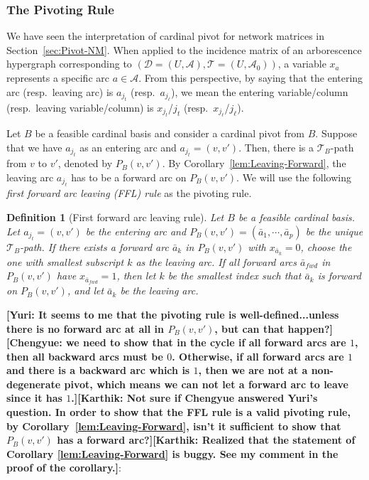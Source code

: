 \documentclass[11pt]{article}
\newcommand{\knote}[1]{{\bf{\color{blue}[\tiny Karthik: #1]}}}
\newcommand{\cnote}[1]{{\bf{\color{red}[\tiny Chengyue: #1]}}}
\newcommand{\ynote}[1]{{\bf{\color{orange}[\tiny Yuri: #1]}}}
\newtheorem{definition}[theorem]{Definition}
\begin{document}
\subsubsection{The Pivoting Rule}\label{sec:FFL}

We have seen the interpretation of cardinal pivot for network matrices in Section~\ref{sec:Pivot-NM}. When applied to the incidence matrix of an arborescence hypergraph corresponding to $(\mathcal{D}=(U,\mathcal{A}),\mathcal{T}=(U,\mathcal{A}_0))$, a variable $x_a$ represents a specific arc $a\in \mathcal{A}$. From this perspective, by saying that the entering arc (resp.~leaving arc) is $a_{j_t}$ (resp.~$a_{j_\ell}$), we mean the entering variable/column (resp.~leaving variable/column) is $x_{j_t}$/$j_t$ (resp.~$x_{j_\ell}$/$j_\ell$). 




Let $B$ be a feasible cardinal basis and consider a cardinal pivot from $B$. Suppose that we have $a_{j_t}$ as an entering arc and $a_{j_t}=(v,v')$. Then, there is a $\mathcal{T}_B$-path from $v$ to $v'$, denoted by $P_B(v,v')$. By Corollary~\ref{lem:Leaving-Forward}, the leaving arc $a_{j_\ell}$ has to be a forward arc on $P_B(v,v')$. We will use the following \emph{first forward arc leaving (FFL) rule} as the pivoting rule. 

\begin{definition}[First forward arc leaving rule]\label{def:First-Forward-Leaving}
Let $B$ be a feasible cardinal basis. Let $a_{j_t}=(v,v')$ be the entering arc and $P_B(v,v')=(\bar{a}_1,\cdots,\bar{a}_p)$ be the unique $\mathcal{T}_B$-path. If there exists a forward arc $\bar{a}_k$ in $P_B(v,v')$ with $x_{\bar{a}_k}=0$, choose the one with smallest subscript $k$ as the leaving arc. If all forward arcs $\bar{a}_{fwd}$ in $P_B(v,v')$ have $x_{\bar{a}_{fwd}}=1$, then let $k$ be the smallest index such that $\bar{a}_k$ is forward on $P_B(v,v')$, and let $\bar{a}_k$ be the leaving arc. \end{definition}

\iffalse
\ynote{It seems to me that the pivoting rule is well-defined...unless there is no forward arc at all in $P_B(v,v')$, but can that happen?}\cnote{we need to show that in the cycle if all forward arcs are $1$, then all backward arcs must be $0$. Otherwise, if all forward arcs are $1$ and there is a backward arc which is $1$, then we are not at a non-degenerate pivot, which means we can not let a forward arc to leave since it has $1$.}\knote{Not sure if Chengyue answered Yuri's question. In order to show that the FFL rule is a valid pivoting rule, by Corollary~\ref{lem:Leaving-Forward}, isn't it sufficient to show that $P_B(v,v')$ has a forward arc?}\knote{Realized that the statement of Corollary \ref{lem:Leaving-Forward} is buggy. See my comment in the proof of the corollary.}:
\end{document}
